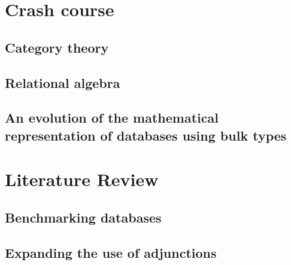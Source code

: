 \section{Crash course}
\subsection{Category theory}
\subsection{Relational algebra}
\subsection{An evolution of the mathematical representation of databases using bulk types}

\section{Literature Review}
\subsection{Benchmarking databases}
\subsection{Expanding the use of adjunctions}